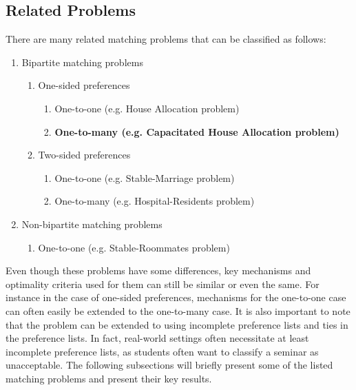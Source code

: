 \subsection{Related Problems}
There are many related matching problems that can be classified as follows:
\begin{enumerate}
    \item Bipartite matching problems
    \begin{enumerate}
        \item One-sided preferences
        \begin{enumerate}
            \item One-to-one (e.g. House Allocation problem)
            \item \textbf{One-to-many (e.g. Capacitated House Allocation problem)} 
        \end{enumerate}
        \item Two-sided preferences
        \begin{enumerate}
            \item One-to-one (e.g. Stable-Marriage problem)
            \item One-to-many (e.g. Hospital-Residents problem)
        \end{enumerate}
    \end{enumerate}
    \item Non-bipartite matching problems 
    \begin{enumerate}
        \item One-to-one (e.g. Stable-Roommates problem)
    \end{enumerate}
\end{enumerate}
Even though these problems have some differences, key mechanisms and optimality criteria used for them can still be similar or even the same. For instance in the case of one-sided preferences, mechanisms for the one-to-one case can often easily be extended to the one-to-many case. It is also important to note that the problem can be extended to using incomplete preference lists and ties in the preference lists. In fact, real-world settings often necessitate at least incomplete preference lists, as students often want to classify a seminar as unacceptable. The following subsections will briefly present some of the listed matching problems and present their key results.  

